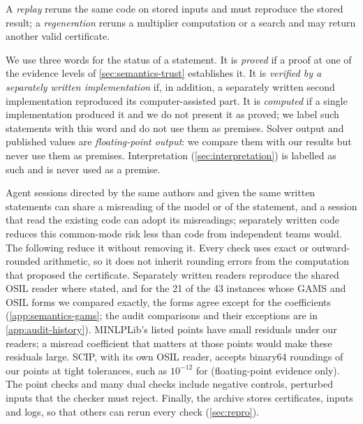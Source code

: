 A \emph{replay} reruns the same code on stored inputs and must reproduce the stored result; a \emph{regeneration} reruns a multiplier computation or a search and may return another valid certificate.

We use three words for the status of a statement.
It is \emph{proved} if a proof at one of the evidence levels of \cref{sec:semantics-trust} establishes it.
It is \emph{verified by a separately written implementation} if, in addition, a separately written second implementation reproduced its computer-assisted part.
It is \emph{computed} if a single implementation produced it and we do not present it as proved; we label such statements with this word and do not use them as premises.
Solver output and published values are \emph{floating-point output}: we compare them with our results but never use them as premises.
Interpretation (\cref{sec:interpretation}) is labelled as such and is never used as a premise.

Agent sessions directed by the same authors and given the same written statements can share a misreading of the model or of the statement, and a session that read the existing code can adopt its misreadings; separately written code reduces this common-mode risk less than code from independent teams would.
The following reduce it without removing it.
Every check uses exact or outward-rounded arithmetic, so it does not inherit rounding errors from the computation that proposed the certificate.
Separately written readers reproduce the shared OSIL reader where stated, and for the 21 of the 43 instances whose GAMS and OSIL forms we compared exactly, the forms agree except for the  coefficients (\cref{app:semantics-gams}; the audit comparisons and their exceptions are in \cref{app:audit-history}).
MINLPLib's listed points have small residuals under our readers; a misread coefficient that matters at those points would make these residuals large.
SCIP, with its own OSIL reader, accepts binary64 roundings of our points at tight tolerances, such as $10^{-12}$ for  (floating-point evidence only).
The point checks and many dual checks include negative controls, perturbed inputs that the checker must reject.
Finally, the archive stores certificates, inputs and logs, so that others can rerun every check (\cref{sec:repro}).
